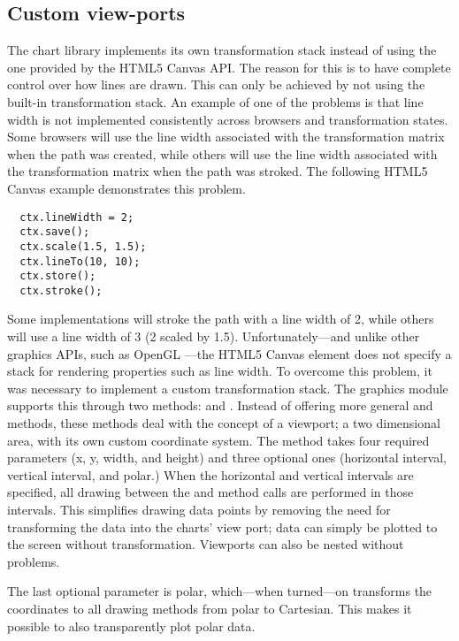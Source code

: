 \subsection{Custom view-ports}
The chart library implements its own transformation stack instead of using the one provided by the HTML5 Canvas API. The reason for this is to have complete control over how lines are drawn. This can only be achieved by not using the built-in transformation stack. An example of one of the problems is that line width is not implemented consistently across browsers and transformation states. Some browsers will use the line width associated with the transformation matrix when the path was created, while others will use the line width associated with the transformation matrix when the path was stroked. The following HTML5 Canvas example demonstrates this problem.
\begin{verbatim}
  ctx.lineWidth = 2;
  ctx.save();
  ctx.scale(1.5, 1.5);
  ctx.lineTo(10, 10);
  ctx.store();
  ctx.stroke();
\end{verbatim}
Some implementations will stroke the path with a line width of 2, while others will use a line width of 3 (2 scaled by 1.5). Unfortunately---and unlike other graphics APIs, such as OpenGL \cite{shreiner05}---the HTML5 Canvas element does not specify a stack for rendering properties such as line width. To overcome this problem, it was necessary to implement a custom transformation stack. The graphics module supports this through two methods:  and . Instead of offering more general  and  methods, these methods deal with the concept of a viewport; a two dimensional area, with its own custom coordinate system. The  method takes four required parameters (x, y, width, and height) and three optional ones (horizontal interval, vertical interval, and polar.) When the horizontal and vertical intervals are specified, all drawing between the  and  method calls are performed in those intervals. This simplifies drawing data points by removing the need for transforming the data into the charts' view port; data can simply be plotted to the screen without transformation. Viewports can also be nested without problems.

The last optional parameter is polar, which---when turned---on transforms the coordinates to all drawing methods from polar to Cartesian. This makes it possible to also transparently plot polar data.


